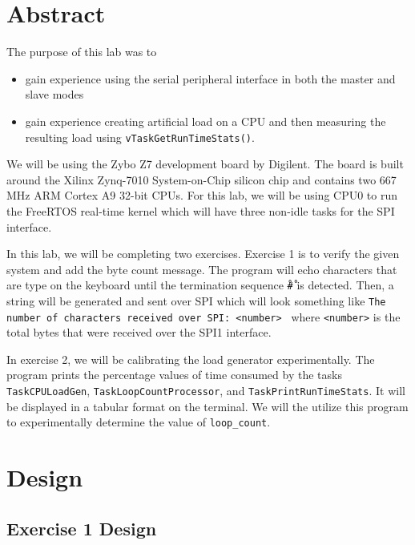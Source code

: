 \documentclass[11pt, letterpaper, titlepage]{article}
\title{\textbf{\Huge{ 
\begin{center}
ECE 315 Lab 3%
\end{center} 
}}}
\author{Lora Ma \\ Benjamin Kong \\ \\ECE 315 Lab Section H41}
\begin{document}
\maketitle
\thispagestyle{empty}
\tableofcontents 
\newpage
{}

\section{Abstract}
The purpose of this lab was to 
\begin{itemize}
  \item gain experience using the serial peripheral interface in both the master and slave modes
  \item gain experience creating artificial load on a CPU and then measuring the resulting load using \texttt{vTaskGetRunTimeStats()}.
\end{itemize}
We will be using the Zybo Z7 development board by Digilent. The board is built around the Xilinx Zynq-7010 System-on-Chip silicon chip and contains two 667 MHz ARM Cortex A9 32-bit CPUs. For this lab, we will be using CPU0 to run the FreeRTOS real-time kernel which will have three non-idle tasks for the SPI interface. 

In this lab, we will be completing two exercises. Exercise 1 is to verify the given system and add the byte count message. The program will echo characters that are type on the keyboard until the termination sequence \texttt{\r#\r} is detected. Then, a string will be generated and sent over SPI which will look something like \texttt{The number of characters received over SPI: <number> \n} where \texttt{<number>} is the total bytes that were received over the SPI1 interface.

In exercise 2, we will be calibrating the load generator experimentally. The program prints the percentage values of time consumed by the tasks \texttt{TaskCPULoadGen}, \texttt{TaskLoopCountProcessor}, and \texttt{TaskPrintRunTimeStats}. It will be displayed in a tabular format on the terminal. We will the utilize this program to experimentally determine the value of \texttt{loop_count}. 

\section{Design}

\subsection{Exercise 1 Design}
\end{document}
